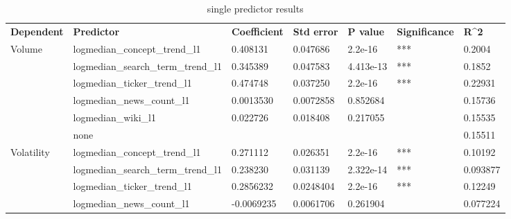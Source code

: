 \begin{table}[!htbp] \centering 
  \caption{single predictor results} 
  \label{} 
  \footnotesize
\begin{tabular}{lllllll}
\textbf{Dependent}          & \textbf{Predictor}                 & \textbf{Coefficient} & \textbf{Std error} & \textbf{P value} & \textbf{Significance} & \textbf{R\textasciicircum{}2} \\
\multirow{6}{*}{Volume}     & logmedian\_concept\_trend\_l1      & 0.408131             & 0.047686           & 2.2e-16          & ***                   & 0.2004                        \\
                            & logmedian\_search\_term\_trend\_l1 & 0.345389             & 0.047583           & 4.413e-13        & ***                   & 0.1852                        \\
                            & logmedian\_ticker\_trend\_l1       & 0.474748             & 0.037250           & 2.2e-16          & ***                   & 0.22931                       \\
                            & logmedian\_news\_count\_l1         & 0.0013530            & 0.0072858          & 0.852684         &                       & 0.15736                       \\
                            & logmedian\_wiki\_l1                & 0.022726             & 0.018408           & 0.217055         &                       & 0.15535                       \\
                            & none                               &                      &                    &                  &                       & 0.15511                       \\ 
\multirow{6}{*}{Volatility} & logmedian\_concept\_trend\_l1      & 0.271112             & 0.026351           & 2.2e-16          & ***                   & 0.10192                       \\
                            & logmedian\_search\_term\_trend\_l1 & 0.238230             & 0.031139           & 2.322e-14        & ***                   & 0.093877                      \\
                            & logmedian\_ticker\_trend\_l1       & 0.2856232            & 0.0248404          & 2.2e-16          & ***                   & 0.12249                       \\
                            & logmedian\_news\_count\_l1         & -0.0069235           & 0.0061706          & 0.261904         &                       & 0.077224                      \\

\end{tabular}
\end{table}
